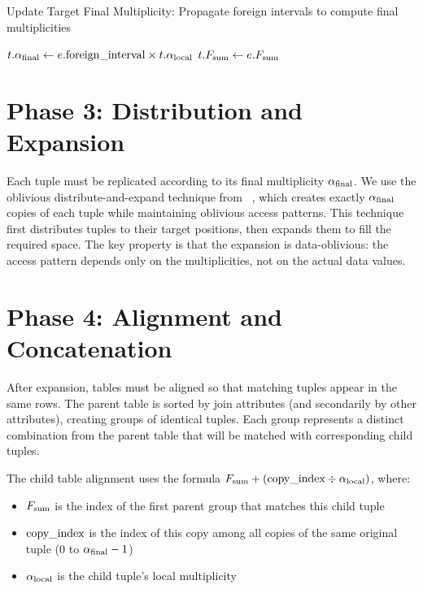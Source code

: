 \begin{algorithm}[H]
\caption{Update Target Final Multiplicity: Propagate foreign intervals to compute final multiplicities}
\label{alg:update-target-final}
\begin{algorithmic}[1]
    \State $t.\alpha_{\text{final}} \leftarrow e.\text{foreign\_interval} \times t.\alpha_{\text{local}}$
    \State $t.F_{\text{sum}} \leftarrow e.F_{\text{sum}}$ 
\EndFunction
\end{algorithmic}
\end{algorithm}

\section{Phase 3: Distribution and Expansion}
\label{sec:distribute-expand}

Each tuple must be replicated according to its final multiplicity $\alpha_{\text{final}}$. We use the oblivious distribute-and-expand technique from \odbj~\cite{krastnikov2020}, which creates exactly $\alpha_{\text{final}}$ copies of each tuple while maintaining oblivious access patterns. This technique first distributes tuples to their target positions, then expands them to fill the required space. The key property is that the expansion is data-oblivious: the access pattern depends only on the multiplicities, not on the actual data values.

\section{Phase 4: Alignment and Concatenation}
\label{sec:align-concat}

After expansion, tables must be aligned so that matching tuples appear in the same rows. The parent table is sorted by join attributes (and secondarily by other attributes), creating groups of identical tuples. Each group represents a distinct combination from the parent table that will be matched with corresponding child tuples.

The child table alignment uses the formula $F_{\text{sum}} + (\text{copy\_index} \div \alpha_{\text{local}})$, where:
\begin{itemize}
\item $F_{\text{sum}}$ is the index of the first parent group that matches this child tuple
\item $\text{copy\_index}$ is the index of this copy among all copies of the same original tuple (0 to $\alpha_{\text{final}}-1$)
\item $\alpha_{\text{local}}$ is the child tuple's local multiplicity
\end{itemize}

